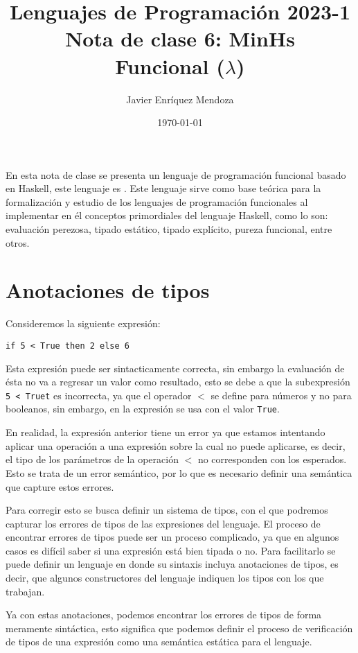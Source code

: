 \documentclass[12pt]{extarticle}
\title{\LARGE 
Lenguajes de Programación 2023-1\\ 
Nota de clase 6: {\sf MinHs} \\
\color{SeaGreen} Funcional ($\lambda$)}
\author{Javier Enríquez Mendoza }
\date{\today}
\begin{document}
\maketitle 

En esta nota de clase se presenta un lenguaje de programación funcional basado en {\sf Haskell}, este lenguaje es \minhs. Este lenguaje sirve como base teórica para la formalización y estudio de los lenguajes de programación funcionales al implementar en él conceptos primordiales del lenguaje Haskell, como lo son: evaluación perezosa, tipado estático, tipado explícito, pureza funcional, entre otros. 

\section{Anotaciones de tipos}

Consideremos la siguiente expresión:

\begin{center}
\texttt{if 5 < True then 2 else 6}
\end{center}


Esta expresión puede ser sintacticamente correcta, sin embargo la evaluación de ésta no va a regresar un valor como resultado, esto se debe a que la subexpresión \texttt{5 < Truet} es incorrecta, ya que el operador $<$ se define para números y no para booleanos, sin embargo, en la expresión se usa con el valor \texttt{True}.

En realidad, la expresión anterior tiene un error ya que estamos intentando aplicar una operación a una expresión sobre la cual no puede aplicarse, es decir, el tipo de los parámetros de la operación $<$ no corresponden con los esperados. Esto se trata de un error semántico, por lo que es necesario definir una semántica que capture estos errores. 

Para corregir esto se busca definir un sistema de tipos, con el que podremos capturar los errores de tipos de las expresiones del lenguaje. El proceso de encontrar errores de tipos puede ser un proceso complicado, ya que en algunos casos es difícil saber si una expresión está bien tipada o no. Para facilitarlo se puede definir un lenguaje en donde su sintaxis incluya anotaciones de tipos, es decir, que algunos constructores del lenguaje indiquen los tipos con los que trabajan. 

Ya con estas anotaciones, podemos encontrar los errores de tipos de forma meramente sintáctica, esto significa que podemos definir el proceso de verificación de tipos de una expresión como una semántica estática para el lenguaje.
\end{document}
